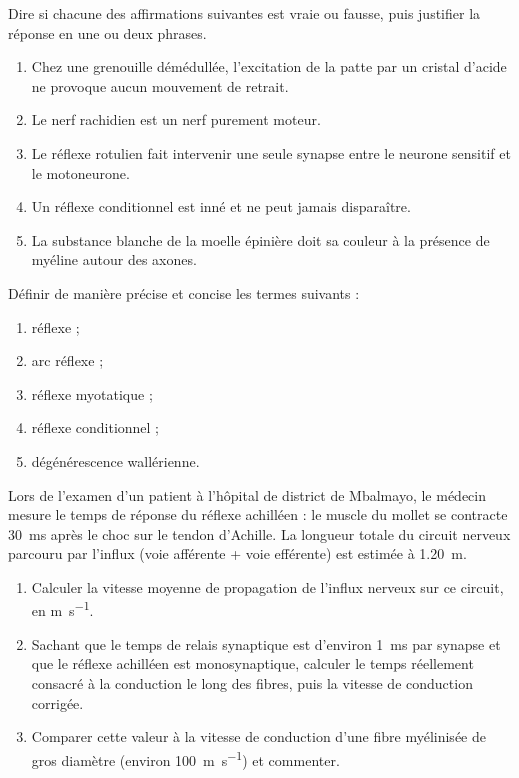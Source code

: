 \documentclass[11pt]{article}
\begin{document}
\begin{exercice}
Dire si chacune des affirmations suivantes est vraie ou fausse, puis justifier la réponse en une ou deux phrases.
\begin{enumerate}
\item Chez une grenouille démédullée, l'excitation de la patte par un cristal d'acide ne provoque aucun mouvement de retrait.
\item Le nerf rachidien est un nerf purement moteur.
\item Le réflexe rotulien fait intervenir une seule synapse entre le neurone sensitif et le motoneurone.
\item Un réflexe conditionnel est inné et ne peut jamais disparaître.
\item La substance blanche de la moelle épinière doit sa couleur à la présence de myéline autour des axones.
\end{enumerate}
\end{exercice}

\begin{exercice}[Définitions]
Définir de manière précise et concise les termes suivants :
\begin{enumerate}
\item réflexe ;
\item arc réflexe ;
\item réflexe myotatique ;
\item réflexe conditionnel ;
\item dégénérescence wallérienne.
\end{enumerate}
\end{exercice}

\begin{exercice}
Lors de l'examen d'un patient à l'hôpital de district de Mbalmayo, le médecin mesure le temps de réponse du réflexe achilléen : le muscle du mollet se contracte \SI{30}{ms} après le choc sur le tendon d'Achille. La longueur totale du circuit nerveux parcouru par l'influx (voie afférente + voie efférente) est estimée à \SI{1,20}{m}.
\begin{enumerate}
\item Calculer la vitesse moyenne de propagation de l'influx nerveux sur ce circuit, en \si{m.s^{-1}}.
\item Sachant que le temps de relais synaptique est d'environ \SI{1}{ms} par synapse et que le réflexe achilléen est monosynaptique, calculer le temps réellement consacré à la conduction le long des fibres, puis la vitesse de conduction corrigée.
\item Comparer cette valeur à la vitesse de conduction d'une fibre myélinisée de gros diamètre (environ \SI{100}{m.s^{-1}}) et commenter.
\end{enumerate}
\end{exercice}
\end{document}
